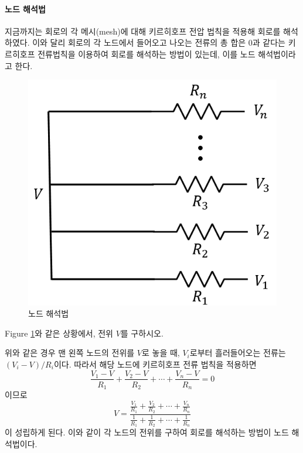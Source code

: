 \paragraph{노드 해석법}
 지금까지는 회로의 각 메시(mesh)에 대해 키르히호프 전압 법칙을 적용해 회로를 해석하였다. 이와 달리 회로의 각 노드에서 들어오고 나오는 전류의 총 합은 0과 같다는 키르히호프 전류법칙을 이용하여 회로를 해석하는 방법이 있는데, 이를 노드 해석법이라고 한다.
\begin{example}
\begin{figure}[h]
\centering\includegraphics[scale=0.3]{Pictures/node.PNG}
\caption{노드 해석법}
\label{fig:node}
\end{figure}
Figure \ref{fig:node}와 같은 상황에서, 전위 $V$를 구하시오.
\end{example}
위와 같은 경우 맨 왼쪽 노드의 전위를 $V$로 놓을 때, $V_i$로부터 흘러들어오는 전류는 $(V_i-V)/R_i$이다. 따라서 해당 노드에 키르히호프 전류 법칙을 적용하면
\begin{equation}
\frac{V_1-V}{R_1}+\frac{V_2-V}{R_2}+\cdots+\frac{V_n-V}{R_n}=0
\end{equation}
이므로
\begin{equation}
V=\frac{\frac{V_1}{R_1}+\frac{V_2}{R_2}+\cdots+\frac{V_n}{R_n}}{\frac{1}{R_1}+\frac{1}{R_2}+\cdots+\frac{1}{R_n}}
\end{equation}
이 성립하게 된다. 이와 같이 각 노드의 전위를 구하여 회로를 해석하는 방법이 노드 해석법이다.

